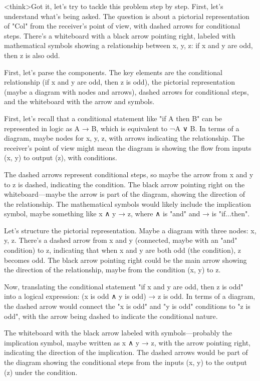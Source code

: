 <think>Got it, let's try to tackle this problem step by step. First, let's understand what's being asked. The question is about a pictorial representation of "Col" from the receiver's point of view, with dashed arrows for conditional steps. There's a whiteboard with a black arrow pointing right, labeled with mathematical symbols showing a relationship between x, y, z: if x and y are odd, then z is also odd.

First, let's parse the components. The key elements are the conditional relationship (if x and y are odd, then z is odd), the pictorial representation (maybe a diagram with nodes and arrows), dashed arrows for conditional steps, and the whiteboard with the arrow and symbols.

First, let's recall that a conditional statement like "if A then B" can be represented in logic as A → B, which is equivalent to ¬A ∨ B. In terms of a diagram, maybe nodes for x, y, z, with arrows indicating the relationship. The receiver's point of view might mean the diagram is showing the flow from inputs (x, y) to output (z), with conditions.

The dashed arrows represent conditional steps, so maybe the arrow from x and y to z is dashed, indicating the condition. The black arrow pointing right on the whiteboard—maybe the arrow is part of the diagram, showing the direction of the relationship. The mathematical symbols would likely include the implication symbol, maybe something like x ∧ y → z, where ∧ is "and" and → is "if...then".

Let's structure the pictorial representation. Maybe a diagram with three nodes: x, y, z. There's a dashed arrow from x and y (connected, maybe with an "and" condition) to z, indicating that when x and y are both odd (the condition), z becomes odd. The black arrow pointing right could be the main arrow showing the direction of the relationship, maybe from the condition (x, y) to z.

Now, translating the conditional statement "if x and y are odd, then z is odd" into a logical expression: (x is odd ∧ y is odd) → z is odd. In terms of a diagram, the dashed arrow would connect the "x is odd" and "y is odd" conditions to "z is odd", with the arrow being dashed to indicate the conditional nature.

The whiteboard with the black arrow labeled with symbols—probably the implication symbol, maybe written as x ∧ y → z, with the arrow pointing right, indicating the direction of the implication. The dashed arrows would be part of the diagram showing the conditional steps from the inputs (x, y) to the output (z) under the condition.

